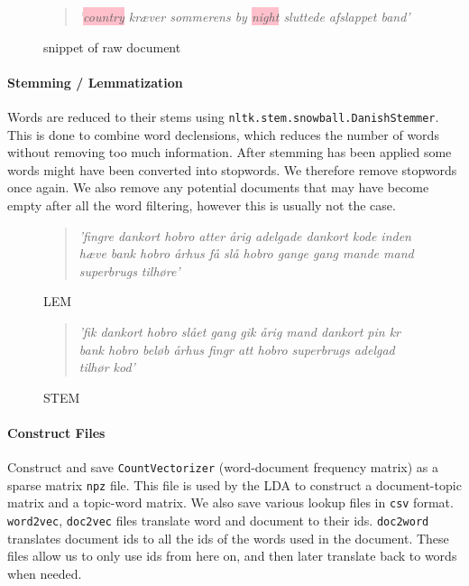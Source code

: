 \begin{figure}[h]
	\begin{quote}
		\textit{
			'\colorbox{pink}{country} kræver sommerens by \colorbox{pink}{night} sluttede afslappet band'
		}
	\end{quote}
	\caption{snippet of raw document}
	\label{prepro:example4}
\end{figure}

\paragraph{Stemming / Lemmatization}
Words are reduced to their stems using \texttt{nltk.stem.snowball.DanishStemmer}. 
This is done to combine word declensions, which reduces the number of words without removing too much information.
After stemming has been applied some words might have been converted into stopwords. We therefore remove stopwords once again.
We also remove any potential documents that may have become empty after all the word filtering, however this is usually not the case.
\begin{figure}[h]
	\begin{quote}
		\textit{
			'fingre dankort hobro atter årig adelgade dankort kode inden hæve bank hobro århus få slå hobro gange gang mande mand superbrugs tilhøre'
		}
	\end{quote}
	\caption{LEM}
	\label{prepro:example5}
\end{figure}
\begin{figure}[h]
	\begin{quote}
		\textit{
			'fik dankort hobro slået gang gik årig mand dankort pin kr bank hobro beløb århus fingr att hobro superbrugs adelgad tilhør kod'
		}
	\end{quote}
	\caption{STEM}
	\label{prepro:example6}
\end{figure}

\paragraph{Construct Files}
Construct and save \texttt{CountVectorizer} (word-document frequency matrix) as a sparse matrix \texttt{npz} file. This file is used by the LDA to construct a document-topic matrix and a topic-word matrix.
We also save various lookup files in \texttt{csv} format. \texttt{word2vec}, \texttt{doc2vec} files translate word and document to their ids.
\texttt{doc2word} translates document ids to all the ids of the words used in the document.
These files allow us to only use ids from here on, and then later translate back to words when needed.

